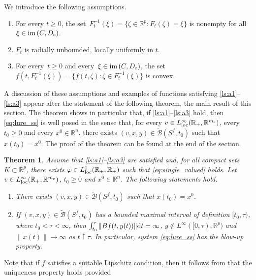 \documentclass[a4paper,11pt]{article}
\newcommand{\R}{\mathbb R}
\newcommand{\sB}{{\mathcal B}}
\numberwithin{equation}{section}
\numberwithin{figure}{section}
\numberwithin{table}{section}
\newtheorem{theorem}{Theorem}[section]
\begin{document}
We introduce the following assumptions.
%
\begin{enumerate}[label = {\bfseries (A\arabic*)}, ref = {\rm (A\arabic*)}]
%
\item \label{ls:a1} For every $t\geq 0$, the set~$F_t^{-1}(\xi)=\{\zeta\in\R^p:F_t(\zeta)=\xi\}$ is nonempty for all $\xi\in{\rm im}\,(C,D_{\rm e})$.
%
\item \label{ls:a2} $F_t$ is radially unbounded, locally uniformly in $t$.
%
\item \label{ls:a3} For every~$t\geq 0$ and every~$\xi\in {\rm im}\,(C,D_{\rm e})$, the set~$f(t,F_t^{-1}(\xi))=\{f(t,\zeta):\zeta\in F_t^{-1}(\xi)\}$ is convex.

\end{enumerate}
%
A discussion of these assumptions and examples of functions satisfying \ref{ls:a1}--\ref{ls:a3} appear after the statement of the following theorem, the main result of this section. The theorem shows in particular that, if \ref{ls:a1}--\ref{ls:a3} hold, then \eqref{eq:lure_ss} is well posed in the sense that, for every $v\in L^\infty_{\rm loc}(\R_+,\R^{m_{\rm e}})$, every $t_0\geq 0$ and every $x^0\in\R^n$, there exists $(v,x,y)\in\tilde\sB(S^f,t_0)$ such that $x(t_0)=x^0$. The proof of the theorem can be found at the end of the section.
%
\begin{theorem}\label{thm:inclusion_wp}
Assume
that \ref{ls:a1}--\ref{ls:a3} are satisfied and, for all compact sets $K\subset\R^p$, there exists $\varphi\in L^1_{\rm loc}(\R_+,\R_+)$ such that \eqref{eq:single_valued} holds.
Let $v\in L^\infty_{\rm loc}(\R_+,\R^{m_{\rm e}})$, $t_0\geq 0$ and $x^0\in\R^n$. The following statements hold.
\begin{enumerate}[label = {\bf (\arabic*)}, ref={\rm (\arabic*)}, leftmargin = 0ex, itemindent = 4.6ex]
%
\item \label{ls:inclusion_wp_s_1} There exists $(v,x,y)\in\tilde\sB(S^f,t_0)$ such that $x(t_0)=x^0$.
%
\item \label{ls:inclusion_wp_s_2}
If $(v,x,y)\in\tilde\sB(S^f,t_0)$ has a bounded maximal interval of definition $[t_0,\tau)$,
where $t_0<\tau<\infty$, then $\int_{t_0}^\tau\|Bf(t,y(t))\|{\rm d}t=\infty$, $y\not\in L^\infty([0,\tau),\R^p)$ and $\|x(t)\|\to\infty$ as $t\uparrow\tau$. In particular,
system \eqref{eq:lure_ss} has the blow-up property.
%
\end{enumerate}
\end{theorem}
%
Note that if $f$ satisfies a suitable Lipschitz condition, then it follows from
 that the uniqueness property holds provided
\end{document}
